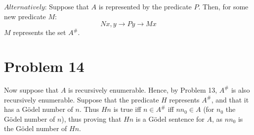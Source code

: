 \documentclass{article}
\theoremstyle{definition}
\begin{document}
$Alternatively$: Suppose that $A$ is represented by the predicate $P$. Then, for some new predicate $M$:
\[ Nx,y\rightarrow Py\rightarrow Mx \] $M$ represents the set $A^\#$.

\section*{Problem 14}
Now suppose that $A$ is recursively enumerable. Hence, by Problem 13, $A^\#$ is also recursively enumerable. Suppose that the predicate $H$ represents $A^\#$, and that 
it has a Gödel number of $n$. Thus $Hn$ is true iff $n\in A^\#$ iff $nn_0\in A$ (for $n_0$ the Gödel number of $n$), thus proving that $Hn$ is a Gödel sentence for 
$A$, as $nn_0$ is the Gödel number of $Hn$.
\end{document}
